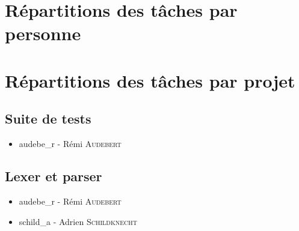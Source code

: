 \section{Répartitions des tâches par personne}







\section{Répartitions des tâches par projet}

\subsection{Suite de tests}

\begin{itemize}
    \item audebe\_r - Rémi \textsc{Audebert}
\end{itemize}

\subsection{Lexer et parser}

\begin{itemize}
    \item audebe\_r - Rémi \textsc{Audebert}
    \item schild\_a - Adrien \textsc{Schildknecht}
\end{itemize}

